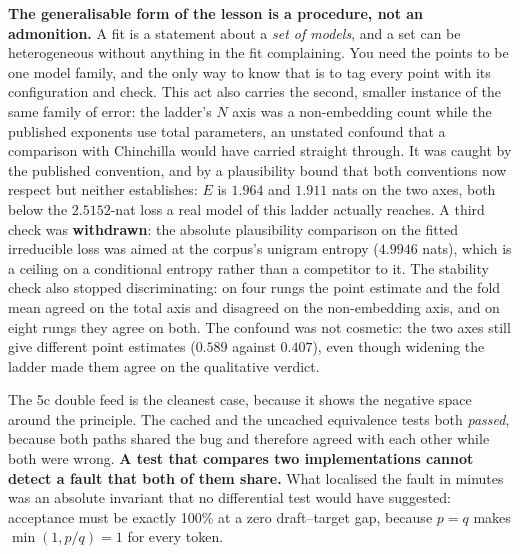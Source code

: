 \documentclass[11pt,a4paper]{article}
\begin{document}
\textbf{The generalisable form of the lesson is a procedure, not an
admonition.} A fit is a statement about a \emph{set of models}, and a set can
be heterogeneous without anything in the fit complaining. You need the points
to be one model family, and the only way to know that is to tag every point
with its configuration and check. This act also carries the second, smaller
instance of the same family of error: the ladder's $N$ axis was a
non-embedding count while the published exponents use total parameters, an
unstated confound that a comparison with Chinchilla would have carried
straight through. It was caught by the published convention, and by a
plausibility bound that both conventions now respect but neither
establishes: $E$ is $1.964$ and $1.911$ nats on the two axes, both below the
$2.5152$-nat loss a real model of this ladder actually reaches. A third check
was \textbf{withdrawn}: the absolute plausibility comparison on the fitted
irreducible loss was aimed at the corpus's unigram entropy ($4.9946$ nats),
which is a ceiling on a conditional entropy rather than a competitor to it.
The stability check also stopped discriminating: on four rungs the point
estimate and the fold mean agreed on the total axis and disagreed on the
non-embedding axis, and on eight rungs they agree on both. The confound was
not cosmetic: the two axes still give different point estimates ($0.589$
against $0.407$), even though widening the ladder made them agree on the
qualitative verdict. %

The 5c double feed is the cleanest case, because it shows the negative space
around the principle. The cached and the uncached equivalence tests both
\emph{passed}, because both paths shared the bug and therefore agreed with each
other while both were wrong. \textbf{A test that compares two implementations
cannot detect a fault that both of them share.} What localised the fault in
minutes was an absolute invariant that no differential test would have
suggested: acceptance must be exactly 100\% at a zero draft--target gap,
because $p = q$ makes $\min(1, p/q) = 1$ for every token.
\end{document}
